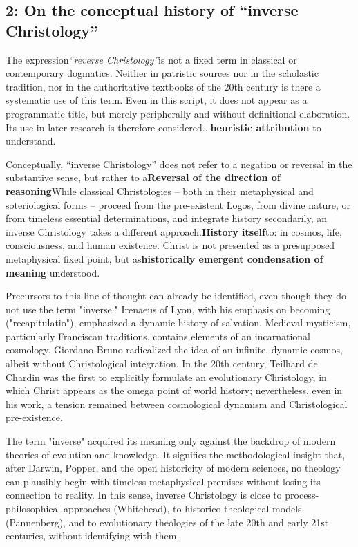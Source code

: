 \documentclass[
]{article}
\begin{document}
\subsection{2: On the conceptual history of ``inverse Christology''}\label{on-the-conceptual-history-of-inverse-christology}

The expression\emph{``reverse Christology''}is not a fixed term in classical or contemporary dogmatics. Neither in patristic sources nor in the scholastic tradition, nor in the authoritative textbooks of the 20th century is there a systematic use of this term. Even in this script, it does not appear as a programmatic title, but merely peripherally and without definitional elaboration. Its use in later research is therefore considered...\textbf{heuristic attribution} to understand.

Conceptually, ``inverse Christology'' does not refer to a negation or reversal in the substantive sense, but rather to a\textbf{Reversal of the direction of reasoning}While classical Christologies -- both in their metaphysical and soteriological forms -- proceed from the pre-existent Logos, from divine nature, or from timeless essential determinations, and integrate history secondarily, an inverse Christology takes a different approach.\textbf{History itself}to: in cosmos, life, consciousness, and human existence. Christ is not presented as a presupposed metaphysical fixed point, but as\textbf{historically emergent condensation of meaning} understood.

Precursors to this line of thought can already be identified, even though they do not use the term "inverse." Irenaeus of Lyon, with his emphasis on becoming ("recapitulatio"), emphasized a dynamic history of salvation. Medieval mysticism, particularly Franciscan traditions, contains elements of an incarnational cosmology. Giordano Bruno radicalized the idea of \hspace{0pt}\hspace{0pt}an infinite, dynamic cosmos, albeit without Christological integration. In the 20th century, Teilhard de Chardin was the first to explicitly formulate an evolutionary Christology, in which Christ appears as the omega point of world history; nevertheless, even in his work, a tension remained between cosmological dynamism and Christological pre-existence.

The term "inverse" acquired its meaning only against the backdrop of modern theories of evolution and knowledge. It signifies the methodological insight that, after Darwin, Popper, and the open historicity of modern sciences, no theology can plausibly begin with timeless metaphysical premises without losing its connection to reality. In this sense, inverse Christology is close to process-philosophical approaches (Whitehead), to historico-theological models (Pannenberg), and to evolutionary theologies of the late 20th and early 21st centuries, without identifying with them.
\end{document}
